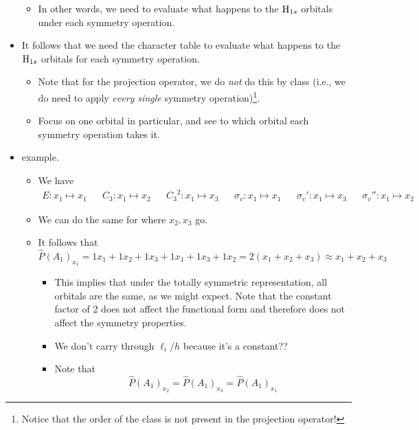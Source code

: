 \documentclass[../notes.tex]{subfiles}
\begin{document}
\begin{itemize}
\begin{itemize}
        \item In other words, we need to evaluate what happens to the $\ce{H}_{1s}$ orbitals under each symmetry operation.
    \end{itemize}
    \item It follows that we need the character table to evaluate what happens to the $\ce{H}_{1s}$ orbitals for each symmetry operation.
    \begin{itemize}
        \item Note that for the projection operator, we do \emph{not} do this by class (i.e., we do need to apply \emph{every single} symmetry operation)\footnote{Notice that the order of the class is not present in the projection operator!}.
        \item Focus on one orbital in particular, and see to which orbital each symmetry operation takes it.
    \end{itemize}
    \item {} example.
    \begin{itemize}
        \item We have
        \begin{align*}
            E:x_1\mapsto x_1&&
            C_3:x_1\mapsto x_2&&
            {C_3}^2:x_1\mapsto x_3&&
            \sigma_v:x_1\mapsto x_1&&
            \sigma_v':x_1\mapsto x_3&&
            \sigma_v'':x_1\mapsto x_2
        \end{align*}
        \item We can do the same for where $x_2,x_3$ go.
        \item It follows that
        \begin{equation*}
            \hat{P}(A_1)_{x_1} = 1x_1+1x_2+1x_3+1x_1+1x_3+1x_2
            = 2(x_1+x_2+x_3)
            \approx x_1+x_2+x_3
        \end{equation*}
        \begin{itemize}
            \item This implies that under the totally symmetric representation, all orbitals are the same, as we might expect. Note that the constant factor of 2 does not affect the functional form and therefore does not affect the symmetry properties.
            \item We don't carry through $\ell_i/h$ because it's a constant??
            \item Note that
            \begin{equation*}
                \hat{P}(A_1)_{x_2} = \hat{P}(A_1)_{x_3} = \hat{P}(A_1)_{x_1}
            \end{equation*}

\end{itemize}
\end{itemize}
\end{itemize}
\end{document}
